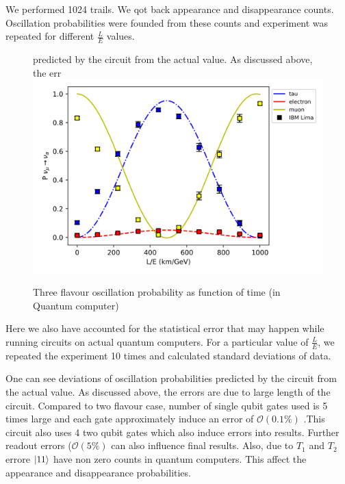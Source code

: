 \documentclass[12pt,a4paper]{report}
\begin{document}
We performed 1024 trails. We qot back appearance and disappearance counts. Oscillation probabilities were founded from these counts and experiment was repeated for different $\frac{L}{E}$ values.
\begin{figure}[h]
	\graphicspath{ {./Images/} }
	\centering	 predicted by the circuit from the actual value. As discussed above, the err
	{\includegraphics[scale=0.8]{fig_9.png}}
	\caption{Three flavour oscillation probability as function of time (in Quantum computer) }
		\label{fig 9}
	\end{figure}\par
	Here we also have accounted for the statistical error that may happen while running circuits on actual quantum computers. For a particular value of $\frac{L}{E}$, we repeated the experiment 10 times and calculated standard deviations of data. \par 
	One can see deviations of oscillation probabilities predicted by the circuit from the actual value. As discussed above, the errors are due to large length of the circuit. Compared to two flavour case, number of single qubit gates used is 5 times large and each gate approximately induce an error of $\mathcal{O}(0.1\%)$ .This circuit also uses 4 two qubit gates which also induce errors into results. Further readout errors  ($\mathcal{O}(5\%)$ can also influence final results. Also, due to $T_{1}$ and $T_{2}$ errore $\ket{11}$ have non zero counts in quantum computers. This affect the appearance and disappearance probabilities.
\end{document}
